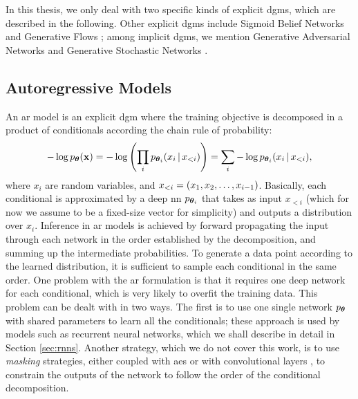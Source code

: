 In this thesis, we only deal with two specific kinds of explicit \glspl{dgm}, which are described in the following. Other explicit \glspl{dgm} include Sigmoid Belief Networks \citep{neal1992sigmoidbeliefnet} and Generative Flows \citep{rezende2015normalizingflows}; among implicit \glspl{dgm}, we mention Generative Adversarial Networks \citep{goodfellow2014gan} and Generative Stochastic Networks \citep{alain2016genstochasticnet}.

\subsection{Autoregressive Models}\label{sec:autoregressive}
An \gls{ar} model is an explicit \gls{dgm} where the training objective is decomposed in a product of conditionals according the chain rule of probability:
$$-\log p_{\Param}(\Vector{x}) = -\log\Paren{\prod_i p_{\Param_i}(x_i \given x_{<i})} = \sum_i -\log p_{\Param_i}(x_i \given x_{<i}),$$
where $x_i$ are random variables, and $x_{<i} = \left( x_1, x_2, \ldots, x_{i-1} \right)$. Basically, each conditional is approximated by a deep \gls{nn} $p_{\boldsymbol{\theta}_i}$ that takes as input $x_{<i}$ (which for now we assume to be a fixed-size vector for simplicity) and outputs a distribution over $x_i$. Inference in \gls{ar} models is achieved by forward propagating the input through each network in the order established by the decomposition, and summing up the intermediate probabilities. To generate a data point according to the learned distribution, it is sufficient to sample each conditional in the same order. One problem with the \gls{ar} formulation is that it requires one deep network for each conditional, which is very likely to overfit the training data. This problem can be dealt with in two ways. The first is to use one single network  $p_{\boldsymbol{\theta}}$ with shared parameters to learn all the conditionals; these approach is used by models such as recurrent neural networks, which we shall describe in detail in Section \ref{sec:rnns}. Another strategy, which we do not cover this work, is to use \emph{masking} strategies, either coupled with \glspl{ae} \citep{germain2015made} or with convolutional layers \citep{vandenoord2016wavenet}, to constrain the outputs of the network to follow the order of the conditional decomposition.

